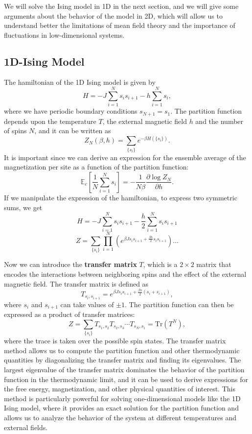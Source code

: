 We will solve the Ising model in 1D in the next section, and we will give some arguments about the behavior of the model in 2D, which will allow us to understand better the limitations of mean field theory and the importance of fluctuations in low-dimensional systems.

\subsection{1D-Ising Model}

The hamiltonian of the 1D Ising model is given by
\[
    H = -J \sum_{i=1}^{N} s_i s_{i+1} - h \sum_{i=1}^{N} s_i,
\]
where we have periodic boundary conditions \(s_{N+1} = s_1\). The partition function depends upon the temperature \(T\), the external magnetic field \(h\) and the number of spins \(N\), and it can be written as
\[
    Z_N(\beta, h) = \sum_{\{s_i\}} e^{-\beta H(\{s_i\})}.
\]
It is important since we can derive an expression for the ensemble average of the magnetization per site as a function of the partition function:
\[
    \mathbb{E}_c \left[ \frac{1}{N} \sum_{i=1}^{N} s_i \right] = - \frac{1}{N\beta} \frac{\partial \log Z_N}{\partial h}.
\]
If we manipulate the expression of the hamiltonian, to express two symmetric sums, we get
\[
    H = -J \sum_{i=1}^{N} s_i s_{i+1} - \frac{h}{2} \sum_{i=1}^{N} s_i s_{i+1}
\]
\[
    Z = \sum_{\{s_i\}} \prod_{i=1}^{N} (e^{\beta J s_i s_{i+1} + \frac{\beta h}{2} s_i s_{i+1}})\dots
\]

Now we can introduce the \textbf{transfer matrix} \(T\), which is a \(2 \times 2\) matrix that encodes the interactions between neighboring spins and the effect of the external magnetic field. The transfer matrix is defined as
\[
    T_{s_i, s_{i+1}} = e^{\beta J s_i s_{i+1} + \frac{\beta h}{2} (s_i + s_{i+1})},
\]
where \(s_i\) and \(s_{i+1}\) can take values of \(\pm 1\). The partition function can then be expressed as a product of transfer matrices:
\[
    Z = \sum_{\{s_i\}} T_{s_1, s_2} T_{s_2, s_3} \cdots T_{s_N, s_1} = \text{Tr}(T^N),
\]
where the trace is taken over the possible spin states. The transfer matrix method allows us to compute the partition function and other thermodynamic quantities by diagonalizing the transfer matrix and finding its eigenvalues. The largest eigenvalue of the transfer matrix dominates the behavior of the partition function in the thermodynamic limit, and it can be used to derive expressions for the free energy, magnetization, and other physical quantities of interest. This method is particularly powerful for solving one-dimensional models like the 1D Ising model, where it provides an exact solution for the partition function and allows us to analyze the behavior of the system at different temperatures and external fields.



